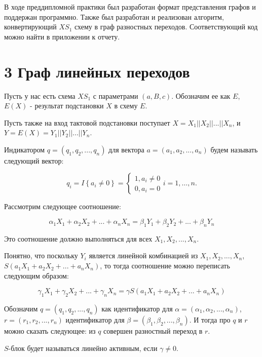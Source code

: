 \documentclass[a4paper,12pt]{extarticle}
\begin{document}
\begin{large}
В ходе преддипломной практики был разработан формат представления графов и поддержан программно. Также был разработан и реализован алгоритм, конвертирующий $XS_1$ схему в граф разностных переходов. Соответствующий код можно найти в приложении к отчету. 

\newpage
\section*{3 Граф линейных переходов}

Пусть у нас есть схема $XS_1$ с параметрами $(a, B, c)$. Обозначим ее как $E$,  $E(X)$ - результат подстановки $X$ в схему $E$. 

Пусть также на вход тактовой подстановки поступает $X = X_1||X_2||...||X_n$, и $Y=E(X) = Y_1||Y_2||...||Y_n$.

Индикатором $q = (q_1, q_2, ..., q_n)$ для вектора $a=(a_1, a_2, ..., a_n)$ будем называть следующий вектор:

\begin{equation}
q_i=I\left\{a_i\ne 0\right\}=\left\{ \begin{array}{c}
1,a_i \neq 0 \\
0,a_i = 0\end{array}
\right.i=1,\dots , n.
\end{equation}

Рассмотрим следующее соотношение:

\begin{equation}
\label{eq:lin_proportion}
\alpha_1X_1 + \alpha_2X_2 + ... + \alpha_nX_n = \beta_1Y_1 + \beta_2Y_2 + ... + \beta_nY_n
\end{equation}

Это соотношение должно выполняться для всех $X_1, X_2, ..., X_n$.

Понятно, что поскольку $Y_i$ является линейной комбинацией из $X_1, X_2, ..., X_n$, $S(a_1X_1 + a_2X_2 + ... + a_nX_n)$, то тогда соотношение можно переписать следующим образом:

$$\gamma_1X_1 + \gamma_2X_2 + ... + \gamma_nX_n = \gamma S(a_1X_1 + a_2X_2 + ... + a_nX_n)$$

Обозначим $q=(q_1, q_2, ..., q_n)$ как идентификатор для $\alpha=(\alpha_1, \alpha_2, ..., \alpha_n)$, $r=(r_1, r_2, ..., r_n)$ идентификатор для $\beta = (\beta_1, \beta_2, ..., \beta_n)$. И тогда про $q$ и $r$ можно сказать следующее: из $q$ совершен разностный переход в $r$. 

$S$-блок будет называться линейно активным, если $\gamma \neq 0$.


\end{large}
\end{document}
